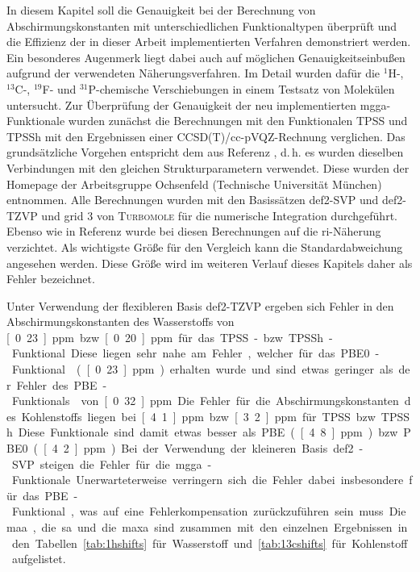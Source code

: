 In diesem Kapitel soll die Genauigkeit bei der Berechnung von Abschirmungskonstanten mit unterschiedlichen Funktionaltypen überprüft und die Effizienz der in dieser Arbeit implementierten Verfahren demonstriert werden. Ein besonderes Augenmerk liegt dabei auch auf möglichen Genauigkeitseinbußen aufgrund der verwendeten Näherungsverfahren. Im Detail wurden dafür die $^1$H-, $^{13}$C-, $^{19}$F- und $^{31}$P-chemische Verschiebungen in einem Testsatz von Molekülen untersucht.\supercite{reiter2017calculation} Zur Überprüfung der Genauigkeit der neu implementierten \ac{mgga}-Funktionale wurden zunächst die Berechnungen mit den Funktionalen TPSS\supercite{tao2003climbing} und TPSSh\supercite{staroverov2003comparative} mit den Ergebnissen einer CCSD(T)/cc-pVQZ\supercite{dunning1989gaussian,woon1993gaussian}-Rechnung verglichen. Das grundsätzliche Vorgehen entspricht dem aus Referenz \cite{flaig2014benchmarking}, d.\,h. es wurden dieselben Verbindungen mit den gleichen Strukturparametern verwendet. Diese wurden der Homepage der Arbeitsgruppe Ochsenfeld (Technische Universität München)\supercite{ochsenfeld:structures} entnommen. Alle Berechnungen wurden mit den Basissätzen def2-SVP und def2-TZVP\supercite{weigend2005balanced} und grid 3\supercite{treutler1995efficient,treutlerphdthesis} von \textsc{Turbomole} für die numerische Integration durchgeführt. Ebenso wie in Referenz \cite{ochsenfeld2004ab} wurde bei diesen Berechnungen auf die \ac{ri}-Näherung verzichtet. Als wichtigste Größe für den Vergleich kann die Standardabweichung angesehen werden.\supercite{flaig2014benchmarking} Diese Größe wird im weiteren Verlauf dieses Kapitels daher als \glqq Fehler\grqq{} bezeichnet.

Unter Verwendung der flexibleren Basis def2-TZVP ergeben sich Fehler in den Abschirmungskonstanten des Wasserstoffs von \unit[0.23]{ppm} bzw. \unit[0.20]{ppm} für das TPSS- bzw. TPSSh-Funktional. Diese liegen sehr nahe am Fehler, welcher für das PBE0-Funktional\supercite{adamo1999toward} (\unit[0.23]{ppm}) erhalten wurde und sind etwas geringer als der Fehler des PBE-Funktionals\supercite{perdew1996generalized} von \unit[0.32]{ppm}. Die Fehler für die Abschirmungskonstanten des Kohlenstoffs liegen bei \unit[4.1]{ppm} bzw. \unit[3.2]{ppm} für TPSS bzw. TPSSh. Diese Funktionale sind damit etwas besser als PBE (\unit[4.8]{ppm}) bzw. PBE0 (\unit[4.2]{ppm}). Bei der Verwendung der kleineren Basis def2-SVP steigen die Fehler für die \ac{mgga}-Funktionale. Unerwarteterweise verringern sich die Fehler dabei insbesondere für das PBE-Funktional, was auf eine Fehlerkompensation zurückzuführen sein muss. Die \ac{maa}, die \ac{sa} und die \ac{maxa} sind zusammen mit den einzelnen Ergebnissen in den Tabellen \ref{tab:1hshifts} für Wasserstoff und \ref{tab:13cshifts} für Kohlenstoff aufgelistet.

